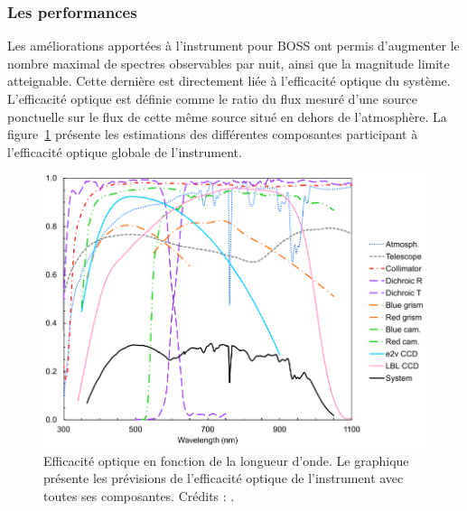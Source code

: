 \subsubsection{Les performances}
Les améliorations apportées à l'instrument pour BOSS ont permis d'augmenter le nombre maximal de spectres observables par nuit, ainsi que la magnitude limite atteignable. Cette dernière est directement liée à l'efficacité optique du système. L'efficacité optique est définie comme le ratio du flux mesuré d'une source ponctuelle sur le flux de cette même source situé en dehors de l'atmosphère. La figure~\ref{fig:SpectroThroughput} présente les estimations des différentes composantes participant à l'efficacité optique globale de l'instrument. %
\begin{figure}
  \centering
  \includegraphics[scale=0.35]{SpectroThroughput}
  \caption{Efficacité optique en fonction de la longueur d'onde. Le graphique présente les prévisions de l'efficacité optique de l'instrument avec toutes ses composantes. Crédits : \textcite{Smee2012}.}
  \label{fig:SpectroThroughput}
\end{figure}

